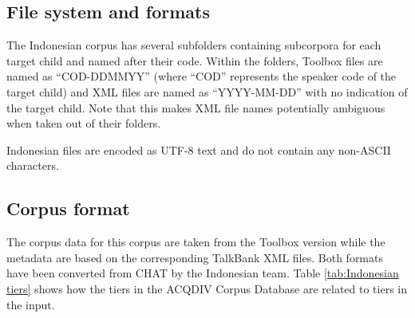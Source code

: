 \documentclass[a4paper, 11pt]{book}
\begin{document}
\subsection{File system and formats}

The Indonesian corpus has several subfolders containing subcorpora for each target child and named after their code. Within the folders, Toolbox files are named as “COD-DDMMYY” (where “COD” represents the speaker code of the target child) and XML files are named as “YYYY-MM-DD” with no indication of the target child. Note that this makes XML file names potentially ambiguous when taken out of their folders. 

Indonesian files are encoded as UTF-8 text and do not contain any non-ASCII characters. 

\subsection{Corpus format}

The corpus data for this corpus are taken from the Toolbox version while the metadata are based on the corresponding TalkBank XML files. Both formats have been converted from CHAT by the Indonesian team. Table \autoref{tab:Indonesian tiers} shows how the tiers in the ACQDIV Corpus Database are related to tiers in the input.
\end{document}
